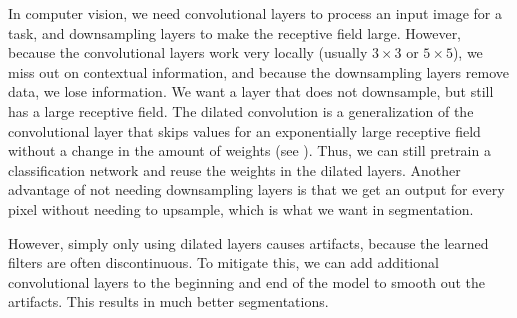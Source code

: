 In computer vision, we need convolutional layers to process an input image for
a task, and downsampling layers to make the receptive field large. However,
because the convolutional layers work very locally (usually $3\times 3$ or
$5\times 5$), we miss out on contextual information, and because the
downsampling layers remove data, we lose information. We want a layer that does
not downsample, but still has a large receptive field. The dilated convolution
is a generalization of the convolutional layer that skips values for an
exponentially large receptive field without a change in the amount of weights
(see ). Thus, we can still pretrain a
classification network and reuse the weights in the dilated layers. Another
advantage of not needing downsampling layers is that we get an output for every
pixel without needing to upsample, which is what we want in segmentation.

However, simply only using dilated layers causes artifacts, because the learned
filters are often discontinuous. To mitigate this, we can add additional
convolutional layers to the beginning and end of the model to smooth out the
artifacts. This results in much better segmentations.
